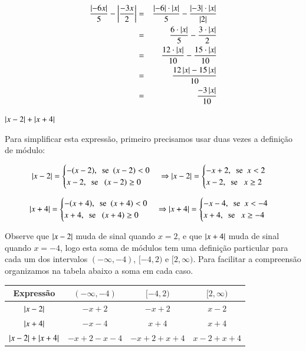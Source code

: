 \begin{exem}
\begin{enumerate}
 \begin{eqnarray*}
  \frac{\left|-6x\right|}{5} - \left|\frac{-3x}{2}\right| &=&
 \frac{\left|-6\right|\cdot \left|x\right|}{5} - \frac{\left|-3\right| \cdot \left|x\right|}{\left|2\right|} \\
 &=& \frac{6 \cdot \left|x\right|}{5} - \frac{ 3 \cdot \left|x\right|}{2} \\
 &=& \frac{12 \cdot \left|x\right|}{10} - \frac{15 \cdot \left|x\right|}{10} \\
 &=& \frac{12\left|x\right| - 15\left|x\right|}{10} \\
 &=& \frac{-3\left|x\right|}{10}
 \end{eqnarray*}
 
\end{enumerate}
\end{exem}

 \begin{exem}
  $\left|x-2\right| + \left|x+4\right|$ \label{eqmodulo}

 Para simplificar esta expressão, primeiro precisamos usar duas vezes a definição de módulo:

 \[ \left|x-2\right| = \begin{cases}
      -(x-2), \ \ \text{se} \ \ (x-2)< 0 \\
      x-2, \ \ \text{se } \ \ (x-2) \geq 0
     \end{cases}
     \Rightarrow
     \left|x-2\right| = \begin{cases}
      -x + 2, \ \ \text{se} \ \ x < 2 \\
      x-2, \ \ \text{se } \ \ x \geq 2
     \end{cases}
  \]

 \[ \left|x+4\right| = \begin{cases}
      -(x+4), \ \ \text{se} \ \ (x+4)< 0 \\
      x+4, \ \ \text{se } \ \ (x+4) \geq 0
     \end{cases}
     \Rightarrow
     \left|x+4\right| = \begin{cases}
      -x - 4, \ \ \text{se} \ \ x < -4 \\
      x + 4, \ \ \text{se } \ \ x \geq -4
     \end{cases}
  \]

  Observe que $\left|x-2\right|$ muda de sinal quando $x=2$, e que $\left|x+4\right|$ muda de sinal quando $x=-4$, logo esta soma de módulos tem uma definição particular para cada um dos intervalos $(-\infty, -4)$, $[-4, 2)$ e $[2, \infty)$. Para facilitar a compreensão organizamos na tabela abaixo a soma em cada caso.

   \begin{table}[H]
 \centering
 \begin{tabular}{|c|c|c|c|} \hline
 \rowcolor{cinza}
  Expressão & $(-\infty, -4)$ & $[-4, 2)$ & $[2, \infty)$  \\\hline
  $\left|x-2\right|$ & $-x+2$ &  $-x+2$ & $x-2$ \\\hline
  $\left|x+4\right|$ & $-x-4$ &  $x+4$ & $x+4$ \\\hline
  $\left|x-2\right| + \left|x+4\right|$ & $-x+2-x-4$ & $-x+2+x+4$ & $x-2+x+4$ \\\hline
 \end{tabular}
\end{table}


\end{exem}
